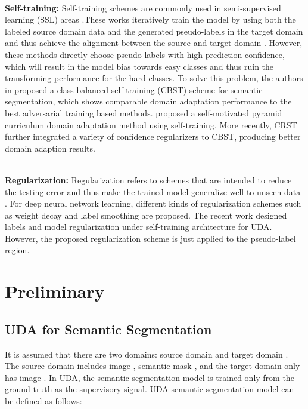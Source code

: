\documentclass[runningheads]{llncs}
\begin{document}
~\\


\noindent\textbf{Self-training:} Self-training schemes are commonly used in semi-supervised learning (SSL) areas \cite{li2005setred}.These works iteratively train the model by using both the labeled source domain data and the generated pseudo-labels in the target domain and thus achieve the alignment between the source and target domain \cite{triguero2015self}. However, these methods directly choose pseudo-labels with high prediction confidence, which will result in the model bias towards easy classes and thus ruin the transforming performance for the hard classes. To solve this problem, the authors in \cite{zou2018unsupervised} proposed a class-balanced self-training (CBST) scheme for semantic segmentation, which shows comparable domain adaptation performance to the best adversarial training based methods. \cite{lian2019constructing} proposed a self-motivated pyramid curriculum domain adaptation method using self-training. More recently, CRST \cite{zou2019confidence} further integrated a variety of confidence regularizers to CBST, producing better domain adaption results.


~\\


\noindent\textbf{Regularization:} Regularization refers to schemes that are intended to reduce the testing error and thus make the trained model generalize well to unseen data \cite{goodfellow2016deep,kukavcka2017regularization}. For deep neural network learning, different kinds of regularization schemes such as weight decay \cite{krizhevsky2012imagenet} and label smoothing \cite{szegedy2016rethinking} are proposed. The recent work \cite{zou2019confidence} designed labels and model regularization under self-training architecture for UDA. However, the proposed regularization scheme is just applied to the pseudo-label region. 
\section{Preliminary}
\subsection{UDA for Semantic Segmentation}
It is assumed that there are two domains: source domain  and target domain . The source domain includes image , semantic mask , and the target domain only has image . In UDA, the semantic segmentation model is trained only from the ground truth  as the supervisory signal. UDA semantic segmentation model can be defined as follows:
 
\end{document}
